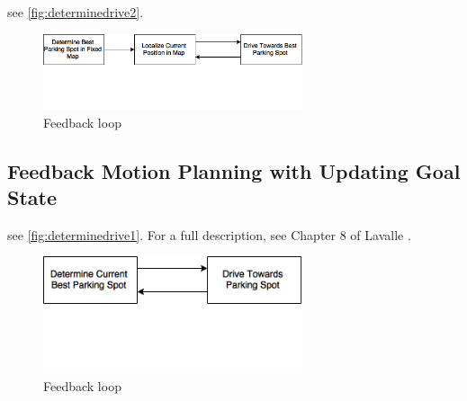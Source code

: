 see \autoref{fig:determinedrive2}.
\begin{figure}
\centering
\includegraphics[width=3in]{figures/determinedrive2.png}
\caption{Feedback loop}
\label{fig:determinedrive2}
\end{figure}


\subsection{Feedback Motion Planning with Updating Goal State}
see \autoref{fig:determinedrive1}.
For a full description, see Chapter 8 of Lavalle \cite{lavalle2006planning}.

\begin{figure}
\centering
\includegraphics[width=3in]{figures/determinedrive1.png}
\caption{Feedback loop}
\label{fig:determinedrive1}
\end{figure}

